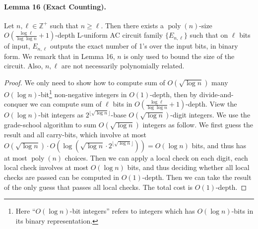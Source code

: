 \paragraph{Lemma 16 (Exact Counting).} Let $n,\ell\in\mathbb Z^+$ such that $n\ge\ell$. Then there exists a $\operatorname{poly}(n)$-size $O\left(\frac{\log\ell}{\log\log n}+1\right)$-depth L-uniform AC circuit family $\{E_{n,\ell}\}$ such that on $\ell$ bits of input, $E_{n,\ell}$ outputs the exact number of 1's over the input bits, in binary form.
We remark that in Lemma 16, $n$ is only used to bound the size of the circuit. Also, $n,\ell$ are not necessarily polynomially related.
\begin{proof}
We only need to show how to compute sum of $O(\sqrt{\log n})$ many $O(\log n)$-bit\footnote{Here ``$O(\log n)$-bit integers'' refers to integers which has $O(\log n)$-bits in its binary representation.} non-negative integers in $O(1)$-depth, then by divide-and-conquer we can compute sum of $\ell$ bits in $O\left(\frac{\log\ell}{\log\log n}+1\right)$-depth.
View the $O(\log n)$-bit integers as $2^{\lfloor\sqrt{\log n}\rfloor}$-base $O(\sqrt{\log n})$-digit integers. We use the grade-school algorithm to sum $O(\sqrt{\log n})$ integers as follow. We first guess the result and all carry-bits, which involve at most $O(\sqrt{\log n})\cdot O\left(\log\left(\sqrt{\log n}\cdot2^{\lfloor\sqrt{\log n}\rfloor}\right)\right)=O(\log n)$ bits, and thus has at most $\operatorname{poly}(n)$ choices. Then we can apply a local check on each digit, each local check involves at most $O(\log n)$ bits, and thus deciding whether all local checks are passed can be computed in $O(1)$-depth. Then we can take the result of the only guess that passes all local checks. The total cost is $O(1)$-depth.
\end{proof}
